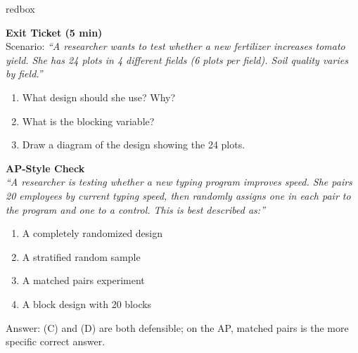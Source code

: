 \documentclass[10pt]{article}
\begin{document}
\begin{skillbox}{redbox}
\begin{minipage}[t]{0.48\linewidth}
    \textbf{Exit Ticket (5 min)}\\
    Scenario: \textit{``A researcher wants to test whether a new fertilizer increases
    tomato yield. She has 24 plots in 4 different fields (6 plots per field). Soil
    quality varies by field.''}
    \begin{enumerate}
        \item What design should she use? Why?
        \item What is the blocking variable?
        \item Draw a diagram of the design showing the 24 plots.
    \end{enumerate}
\end{minipage}
\hfill
\begin{minipage}[t]{0.48\linewidth}
    \textbf{AP-Style Check}\\
    \textit{``A researcher is testing whether a new typing program improves speed.
    She pairs 20 employees by current typing speed, then randomly assigns one in
    each pair to the program and one to a control. This is best described as:''}
    \begin{enumerate}[label=(\Alph*)]
        \item A completely randomized design
        \item A stratified random sample
        \item A matched pairs experiment
        \item A block design with 20 blocks
    \end{enumerate}
    Answer: (C) and (D) are both defensible; on the AP, matched pairs is the
    more specific correct answer.
\end{minipage}
\end{skillbox}
\end{document}
